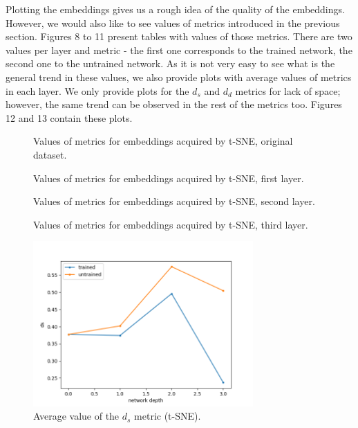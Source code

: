 \documentclass{article}
\begin{document}
Plotting the embeddings gives us a rough idea of the quality of the
embeddings. However, we would also like to see values of metrics
introduced in the previous section. Figures 8 to 11 present tables
with values of those metrics. There are two values per layer and metric - the
first one corresponds to the trained network, the second one to the untrained
network. As it is not very easy to see what is the general trend in these
values, we also provide plots with average values of metrics in each layer.
We only provide plots for the \(d_s\) and \(d_d\) metrics for lack of space;
however, the same trend can be observed in the rest of the metrics too.
Figures 12 and 13 contain these plots.

\begin{figure}
  \centering
    \resizebox{\textwidth}{!}{
        
    }
  \caption{Values of metrics for embeddings acquired by t-SNE, original dataset.}
\end{figure}

\begin{figure}
  \centering
    \resizebox{\textwidth}{!}{
        
    }
    \caption{Values of metrics for embeddings acquired by t-SNE, first layer.}
\end{figure}

\begin{figure}
  \centering
    \resizebox{\textwidth}{!}{
        
    }
    \caption{Values of metrics for embeddings acquired by t-SNE, second layer.}
\end{figure}

\begin{figure}
  \centering
    \resizebox{\textwidth}{!}{
        
    }
    \caption{Values of metrics for embeddings acquired by t-SNE, third layer.}
\end{figure}

\begin{figure}
  \centering
    \includegraphics[width=0.75\textwidth]{../../out/activations_cnn/mnist/t-sne/plot_metric_ds.png}
    \caption{Average value of the \(d_s\) metric (t-SNE).}
\end{figure}
\end{document}
